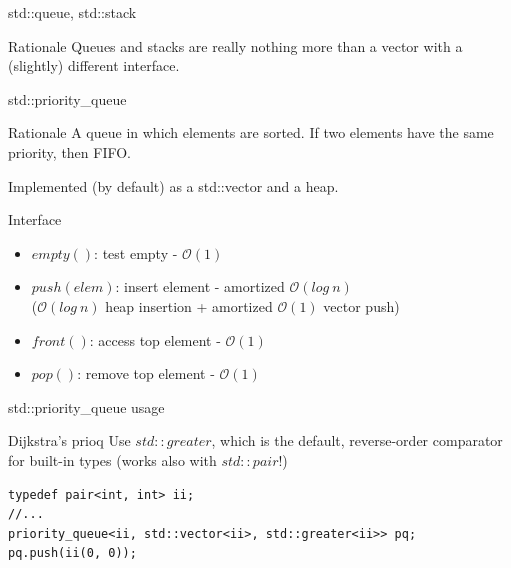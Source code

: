 \documentclass{beamer}
\begin{document}
\begin{frame}{std::queue, std::stack}
\begin{block}{Rationale}
Queues and stacks are really nothing more than a vector with a (slightly) different interface.
\end{block}
\end{frame}

\begin{frame}{std::priority\_queue}
\begin{block}{Rationale}
A queue in which elements are sorted. If two elements have the same priority, then FIFO.

Implemented (by default) as a std::vector and a heap.
\end{block}

\begin{block}{Interface}
\begin{itemize}
\item $empty()$: test empty - $\mathcal{O}(1)$
\item $push(elem)$: insert element - amortized $\mathcal{O}(log~n)$ \\ ($\mathcal{O}(log~n)$ heap insertion + amortized $\mathcal{O}(1)$ vector push)
\item $front()$: access top element - $\mathcal{O}(1)$
\item $pop()$: remove top element - $\mathcal{O}(1)$
\end{itemize}
\end{block}
\end{frame}

\begin{frame}[fragile]{std::priority\_queue usage}
\begin{block}{Dijkstra's prioq}
Use $std::greater$, which is the default, reverse-order comparator for built-in types (works also with $std::pair$!)
\begin{lstlisting}
typedef pair<int, int> ii;
//...
priority_queue<ii, std::vector<ii>, std::greater<ii>> pq;
pq.push(ii(0, 0));
\end{lstlisting}
\end{block}
\end{frame}
\end{document}
